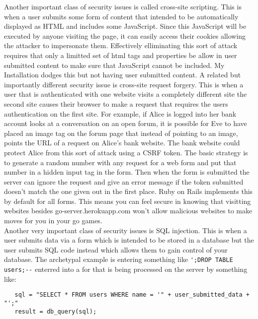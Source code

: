\documentclass[11pt]{article}
\begin{document}
  Another important class of security issues is called cross-site
  scripting.  This is when a user submits some form of content that
  intended to be automatically displayed as HTML and includes some
  JavaScript.  Since this JavaScript will be executed by anyone
  visiting the page, it can easily access their cookies allowing the
  attacker to impersonate them.  Effectively elliminating this sort of
  attack requires that only a limitted set of html tags and properties
  be allow in user submitted content to make sure that JavaScript
  cannot be included.  My Installation dodges this but not having user
  submitted content.  A related but importantly different security
  issue is cross-site request forgery.  This is when a user that is
  authenticated with one website visits a completely different site
  the second site causes their browser to make a request that requires
  the users authentication on the first site.  For example, if Alice
  is logged into her bank account looks at a conversation on an open
  forum, it is possible for Eve to have placed an image tag on the
  forum page that instead of pointing to an image, points the URL of a
  request on Alice's bank website.  The bank website could protect
  Alice from this sort of attack using a CSRF token.  The basic
  strategy is to generate a random number with any request for a web
  form and put that number in a hidden input tag in the form.  Then
  when the form is submitted the server can ignore the request and
  give an error message if the token submitted doesn't match the one
  given out in the first place.  Ruby on Rails implements this by
  default for all forms.  This means you can feel secure in knowing
  that visitting websites besides go-server.herokuapp.com won't allow
  malicious websites to make moves for you in your go games. \\
  
  Another very important class of security issues is SQL injection.
  This is when a user submits data via a form which is intended to be
  stored in a database but the user submits SQL code instead which
  allows them to gain control of your database.  The archetypal
  example is entering something like \verb|';DROP TABLE users;--|
  enterred into a for that is being processed on the server by
  something like:
  
\begin{verbatim}
   sql = "SELECT * FROM users WHERE name = '" + user_submitted_data + "';"
   result = db_query(sql);
\end{verbatim}
\end{document}
